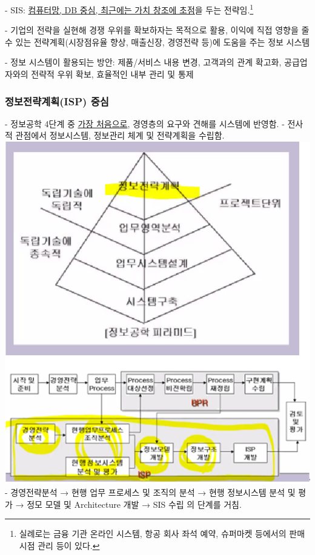 \documentclass[a4paper,12pt]{article}
\begin{document}
- SIS: \underline{컴퓨터망, DB 중심, 최근에는 가치 창조에 초점}을 두는 전략임.\footnote{실례로는 금융 기관 온라인 시스템, 항공 회사 좌석 예약, 슈퍼마켓 등에서의 판매 시점 관리 등이 있다.}

- 기업의 전략을 실현해 경쟁 우위를 확보하자는 목적으로 활용, 이익에 직접 영향을 줄 수 있는 전략계획(시장점유율 향상, 매출신장, 경영전략 등)에 도움을 주는 정보 시스템

- 정보 시스템이 활용되는 방안: 제품/서비스 내용 변경, 고객과의 관계 확고화, 공급업자와의 전략적 우위 확보, 효율적인 내부 관리 및 통제

\subsubsection{정보전략계획(ISP) 중심}
- 정보공학 4단계 중 \underline{가장 처음으로}, 경영층의 요구와 견해를 시스템에 반영함.
\newline
- 전사적 관점에서 정보시스템, 정보관리 체계 및 전략계획을 수립함.
\newline
\newline
\includegraphics[scale=0.8]{21}
\newline
\newline
- 경영전략분석 → 현행 업무 프로세스 및 조직의 분석 → 현행 정보시스템 분석 및 평가 → 정모 모델 및 Architecture 개발 → SIS 수립 의 단계를 거침.
\end{document}
